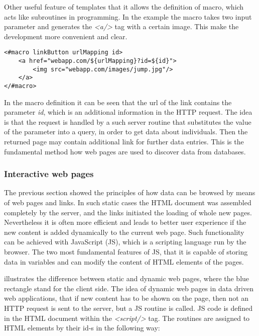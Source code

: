 Other useful feature of templates that it allows the definition of macro, which acts like subroutines in programming. In the example the macro \textit{\@linkButton} takes two input parameter and generates the \textit{<a/>} tag with a certain image. This make the development more convenient and clear.

\begin{lstlisting}[captionpos=b, caption=Macro definition, label=skullJSON, belowskip=1em, aboveskip=2em,
basicstyle=\footnotesize,frame=single]
<#macro linkButton urlMapping id>
	<a href="webapp.com/${urlMapping}?id=${id}">
		<img src="webapp.com/images/jump.jpg"/>
	</a>
</#macro>
\end{lstlisting}


In the macro definition it can be seen that the url of the link contains the parameter \textit{id}, which is an additional information in the HTTP request. The idea is that the request is handled by a such server routine that substitutes the value of the parameter into a query, in order to get data about individuals. Then the returned page may contain additional link for further data entries. This is the fundamental method how web pages are used to discover data from databases.

\subsubsection{Interactive web pages}

The previous section showed the principles of how data can be browsed by means of web pages and links. In such static cases the HTML document was assembled completely by the server, and the links initiated the loading of whole new pages. Nevertheless it is often more efficient and leads to better user experience if the new content is added dynamically to the current web page. Such functionality can be achieved with JavaScript (JS), which is a scripting language run by the browser. The two most fundamental features of JS, that it is capable of storing data in variables and can modify the content of HTML elements of the pages. 


 illustrates the difference between static and dynamic web pages, where the blue rectangle stand for the client side. The idea of dynamic web pages in data driven web applications, that if new content has to be shown on the page, then not an HTTP request is sent to the server, but a JS routine is called. JS code is defined in the HTML document within the \textit{<script/>} tag. The routines are assigned to HTML elements by their id-s in the following way:

